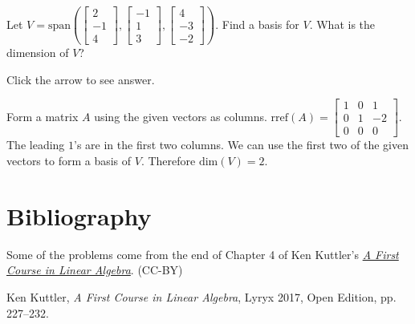 \documentclass{ximera}
\begin{document}
\begin{problem}\label{prob:dimCollectionVectors}
    Let $V=\text{span}\left(\begin{bmatrix}2\\-1\\4\end{bmatrix}, \begin{bmatrix}-1\\1\\3\end{bmatrix}, \begin{bmatrix}4\\-3\\-2\end{bmatrix}\right) $.  Find a basis for $V$.  What is the dimension of $V$?

Click the arrow to see answer.

\begin{expandable}{}{}
    Form a matrix $A$ using the given vectors as columns.  $\text{rref}(A)=\begin{bmatrix}1& 0 &1\\
 0& 1& -2\\
 0& 0& 0\end{bmatrix}$.  The leading $1$'s are in the first two columns.  We can use the first two of the given vectors to form a basis of $V$.  Therefore $\text{dim}(V)=2$.
\end{expandable}
\end{problem}


\section*{Bibliography}
Some of the problems come from the end of Chapter 4 of Ken Kuttler's \href{https://open.umn.edu/opentextbooks/textbooks/a-first-course-in-linear-algebra-2017}{\it A First Course in Linear Algebra}. (CC-BY)

Ken Kuttler, {\it  A First Course in Linear Algebra}, Lyryx 2017, Open Edition, pp. 227--232.
\end{document}
